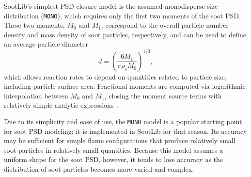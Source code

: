 \documentclass[preprint,letterpaper]{elsarticle}
\begin{document}
\begin{table}
    \caption{Summary of soot particle size distribution models implemented in SootLib.}
    \label{t:psd_models}
    \centering
\end{table}


SootLib's simplest PSD closure model is the assumed monodisperse size distribution (\texttt{MONO}), which requires only the first two moments of the soot PSD. These two moments, $M_0$ and $M_1$, correspond to the overall particle number density and mass density of soot particles, respectively, and can be used to define an average particle diameter
\begin{equation}
    d = \left( \frac{6M_1}{\pi \rho_s M_0} \right)^{1/3},
\end{equation}
which allows reaction rates to depend on quantities related to particle size, including particle surface area. Fractional moments are computed via logarithmic interpolation between $M_0$ and $M_1$, closing the moment source terms with relatively simple analytic expressions~\cite{Lignell_2008b}.

Due to its simplicity and ease of use, the \texttt{MONO} model is a popular starting point for soot PSD modeling; it is implemented in SootLib for that reason. Its accuracy may be sufficient for simple flame configurations that produce relatively small soot particles in relatively small quantities. Because this model assumes a uniform shape for the soot PSD, however, it tends to lose accuracy as the distribution of soot particles becomes more varied and complex.
\end{document}
